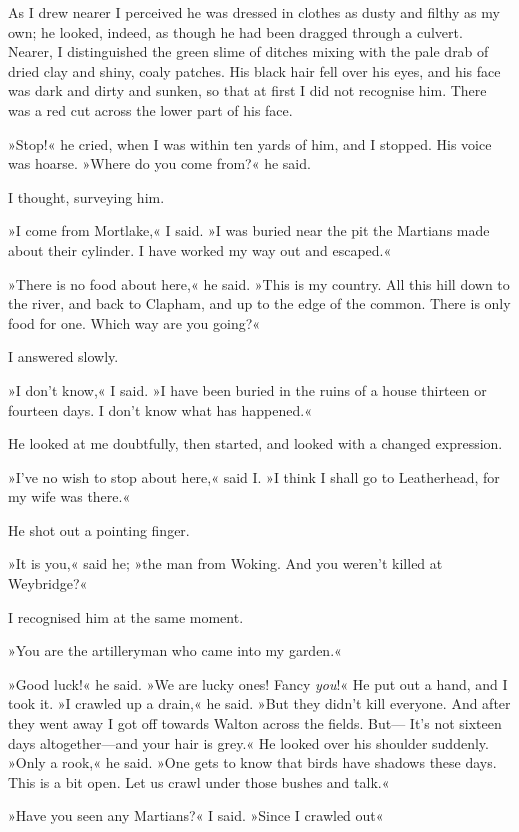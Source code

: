 As I drew nearer I perceived he was dressed in clothes as dusty and filthy as my own; he looked, indeed, as though he had been dragged through a culvert. Nearer, I distinguished the green slime of ditches mixing with the pale drab of dried clay and shiny, coaly patches. His black hair fell over his eyes, and his face was dark and dirty and sunken, so that at first I did not recognise him. There was a red cut across the lower part of his face.

»Stop!« he cried, when I was within ten yards of him, and I stopped. His voice was hoarse. »Where do you come from?« he said.

I thought, surveying him.

»I come from Mortlake,« I said. »I was buried near the pit the Martians made about their cylinder. I have worked my way out and escaped.«

»There is no food about here,« he said. »This is my country. All this hill down to the river, and back to Clapham, and up to the edge of the common. There is only food for one. Which way are you going?«

I answered slowly.

»I don't know,« I said. »I have been buried in the ruins of a house thirteen or fourteen days. I don't know what has happened.«

He looked at me doubtfully, then started, and looked with a changed expression.

»I've no wish to stop about here,« said I. »I think I shall go to Leatherhead, for my wife was there.«

He shot out a pointing finger.

»It is you,« said he; »the man from Woking. And you weren't killed at Weybridge?«

I recognised him at the same moment.

»You are the artilleryman who came into my garden.«

»Good luck!« he said. »We are lucky ones! Fancy \textit{you}!« He put out a hand, and I took it. »I crawled up a drain,« he said. »But they didn't kill everyone. And after they went away I got off towards Walton across the fields. But— It's not sixteen days altogether—and your hair is grey.« He looked over his shoulder suddenly. »Only a rook,« he said. »One gets to know that birds have shadows these days. This is a bit open. Let us crawl under those bushes and talk.«

»Have you seen any Martians?« I said. »Since I crawled out\longdash«

